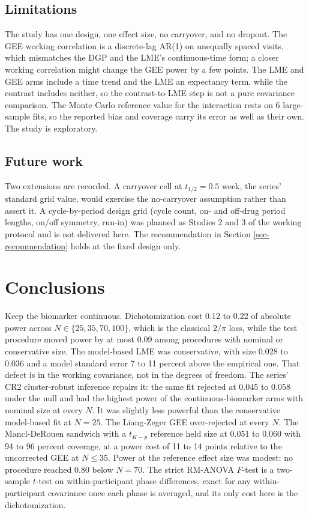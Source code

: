 \documentclass[
  11pt,
]{article}
\begin{document}
\subsection{Limitations}\label{limitations}

The study has one design, one effect size, no carryover, and no
dropout. The GEE working correlation is a discrete-lag AR(1) on
unequally spaced visits, which mismatches the DGP and the LME's
continuous-time form; a closer working correlation might change the
GEE power by a few points. The LME and GEE arms include a time
trend and the LME an expectancy term, while the contrast includes
neither, so the contrast-to-LME step is not a pure covariance
comparison. The Monte Carlo reference value for the interaction
rests on 6 large-sample fits, so the reported bias and
coverage carry its error as well as their own. The study is
exploratory.

\subsection{Future work}\label{future-work}

Two extensions are recorded. A carryover cell at \(t_{1/2} = 0.5\)
week, the series' standard grid value, would exercise the
no-carryover assumption rather than assert it. A cycle-by-period
design grid (cycle count, on- and off-drug period lengths, on/off
symmetry, run-in) was planned as Studies 2 and 3 of the working
protocol and is not delivered here. The recommendation in Section
\ref{sec-recommendation} holds at the fixed design only.

\section{Conclusions}\label{conclusions}

Keep the biomarker continuous. Dichotomization cost 0.12 to 0.22 of
absolute power across \(N \in \{25, 35, 70, 100\}\), which is the
classical \(2/\pi\) loss, while the test procedure moved power by at
most 0.09 among procedures with nominal or conservative
size. The model-based LME was conservative, with size
0.028 to 0.036 and a model standard error
7 to 11
percent above the empirical one. That defect is in the working
covariance, not in the degrees of freedom. The series' CR2
cluster-robust inference repairs it: the same fit rejected at
0.045 to 0.058 under the null and had the highest power
of the continuous-biomarker arms with nominal size at every \(N\).
It was slightly less powerful than the conservative model-based fit
at \(N = 25\). The Liang-Zeger GEE over-rejected at every \(N\). The
Mancl-DeRouen sandwich with a \(t_{K-p}\) reference held size at
0.051 to 0.060 with
94 to 96 percent coverage, at a power
cost of 11 to 14
points relative to the uncorrected GEE at \(N \le 35\). Power at the
reference effect size was modest: no procedure reached 0.80 below
\(N = 70\). The
strict RM-ANOVA \(F\)-test is a two-sample \(t\)-test on
within-participant phase differences, exact for any
within-participant covariance once each phase is averaged, and its
only cost here is the dichotomization.
\end{document}
